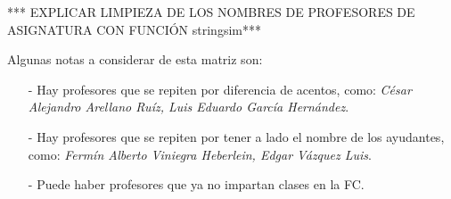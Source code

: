 *** EXPLICAR LIMPIEZA DE LOS NOMBRES DE PROFESORES DE ASIGNATURA CON FUNCIÓN stringsim***









Algunas notas a considerar de esta matriz son:
  
  \begin{itemize}
\item[-] Hay profesores que se repiten por diferencia de acentos, como: \textit{César Alejandro Arellano Ruíz, Luis Eduardo García Hernández}.

\item[-] Hay profesores que se repiten por tener a lado el nombre de los ayudantes, como: \textit{Fermín Alberto Viniegra Heberlein, Edgar Vázquez Luis}.

\item[-] Puede haber profesores que ya no impartan clases en la FC.
\end{itemize}
